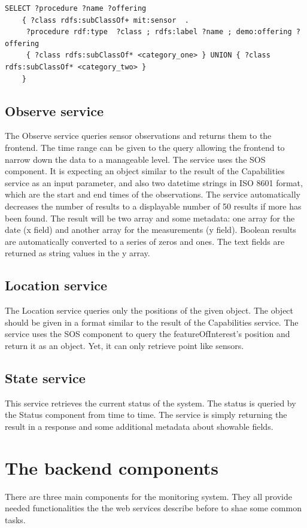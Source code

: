 \begin{lstlisting}[caption={SPARQL query for Search\label{lst:searchsparql}}]
SELECT ?procedure ?name ?offering
    { ?class rdfs:subClassOf+ mit:sensor  .
     ?procedure rdf:type  ?class ; rdfs:label ?name ; demo:offering ?offering 
     { ?class rdfs:subClassOf* <category_one> } UNION { ?class rdfs:subClassOf* <category_two> }
    }
\end{lstlisting}

\subsection{Observe service}
The Observe service queries sensor observations and returns them to the frontend.
The time range can be given to the query allowing the frontend to narrow down the data to a manageable level. The service uses the SOS component. It is expecting an object similar to the result of the Capabilities service as an input parameter, and also two datetime strings in ISO 8601 format, which are the start and end times of the observations. The service automatically decreases the number of results to a displayable number of 50 results if more has been found. The result will be two array and some metadata: one array for the date (x field) and another array for the measurements (y field). Boolean results are automatically converted to a series of zeros and ones. The text fields are returned as string values in the y array.

\subsection{Location service}
The Location service queries only the positions of the given object. The object should be given in a format similar to the result of the Capabilities service. The service uses the SOS component to query the featureOfInterest's position and return it as an object. Yet, it can only retrieve point like sensors.

\subsection{State service}
This service retrieves the current status of the system. The status is queried by the Status component from time to time. The service is simply returning the result in a response and some additional metadata about showable fields.

\section{The backend components}
There are three main components for the monitoring system. They all provide needed functionalities the the web services describe before to shae some common tasks.

